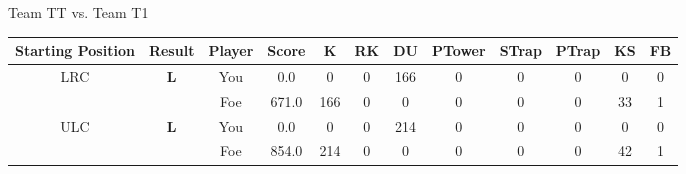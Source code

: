 \documentclass[a4paper,12pt]{article}
\begin{document}
  \vspace*{2em}
  \par {\large {\color{Gray} Team} TT {\color{Gray}
      vs. Team} T1}
  \newline
  \begin{tabular}[t]{| c | c | c | c | c | c | c | c | c | c | c | c
      |}
    \hline
    Starting Position & \textbf{Result} & Player & \textbf{Score} & K & RK & DU & PTower & STrap & PTrap & KS & FB \\
    
      
                      
      
                      
      
                      
      
        \hline
        \multirow{2}{*}{  LRC
             } &
              \multirow{2}{*}{  \textbf{L}  } & 
                    \cellcolor{yellow!25} You & \cellcolor{yellow!25} 0.0 & \cellcolor{yellow!25} 0 &
                    \cellcolor{yellow!25} 0 & \cellcolor{yellow!25} 166 & \cellcolor{yellow!25} 0 &
                    \cellcolor{yellow!25} 0 & \cellcolor{yellow!25} 0 & \cellcolor{yellow!25} 0 &
                    \cellcolor{yellow!25} 0 \\
                    \cline{3-12}
                    & & \cellcolor{red!15} Foe & \cellcolor{red!15} 671.0 & \cellcolor{red!15} 166 & \cellcolor{red!15}
                    0 & \cellcolor{red!15} 0
                    & \cellcolor{red!15} 0 & \cellcolor{red!15}
                    0 & \cellcolor{red!15} 0 
                    & \cellcolor{red!15} 33 & \cellcolor{red!15}
                    1 \\
                    
                      
      
                      
      
                      
      
                      
      
                      
      
        \hline
        \multirow{2}{*}{  ULC  } &
              \multirow{2}{*}{  \textbf{L}  } & 
                    \cellcolor{yellow!25} You & \cellcolor{yellow!25} 0.0 & \cellcolor{yellow!25} 0 &
                    \cellcolor{yellow!25} 0 & \cellcolor{yellow!25} 214 & \cellcolor{yellow!25} 0 &
                    \cellcolor{yellow!25} 0 & \cellcolor{yellow!25} 0 & \cellcolor{yellow!25} 0 &
                    \cellcolor{yellow!25} 0 \\
                    \cline{3-12}
                    & & \cellcolor{red!15} Foe & \cellcolor{red!15} 854.0 & \cellcolor{red!15} 214 & \cellcolor{red!15}
                    0 & \cellcolor{red!15} 0
                    & \cellcolor{red!15} 0 & \cellcolor{red!15}
                    0 & \cellcolor{red!15} 0 
                    & \cellcolor{red!15} 42 & \cellcolor{red!15}
                    1 \\
                    

\end{tabular}
\end{document}
